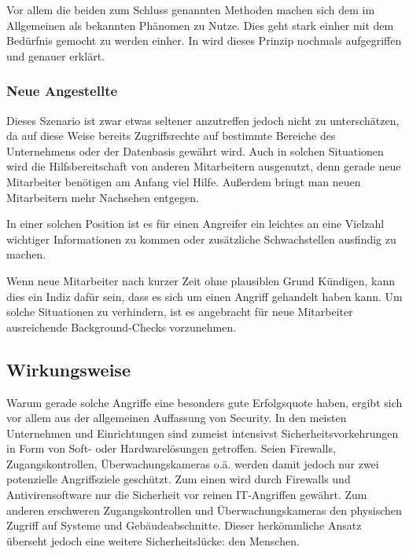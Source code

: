 Vor allem die beiden zum Schluss genannten Methoden machen sich dem im Allgemeinen als  bekannten Phänomen zu Nutze. Dies geht stark einher mit dem Bedürfnis gemocht zu werden einher. In  wird dieses Prinzip nochmals aufgegriffen und genauer erklärt.


\subsubsection*{Neue Angestellte}\label{sec:neue-angestellte}
Dieses Szenario ist zwar etwas seltener anzutreffen jedoch nicht zu unterschätzen, da auf diese
Weise bereits Zugriffsrechte auf bestimmte Bereiche des Unternehmens oder der Datenbasis gewährt wird.
Auch in solchen Situationen wird die Hilfsbereitschaft von anderen Mitarbeitern ausgenutzt, denn
gerade neue Mitarbeiter benötigen am Anfang viel Hilfe.
Außerdem bringt man neuen Mitarbeitern mehr Nachsehen entgegen.

In einer solchen Position ist es für einen Angreifer ein leichtes an eine Vielzahl wichtiger
Informationen zu kommen oder zusätzliche Schwachstellen ausfindig zu machen.

Wenn neue Mitarbeiter nach kurzer Zeit ohne plausiblen Grund Kündigen, kann dies ein Indiz dafür sein,
dass es sich um einen Angriff gehandelt haben kann.
Um solche Situationen zu verhindern, ist es angebracht für neue Mitarbeiter ausreichende Background-Checks vorzunehmen. \citep{hacking-the-human}

\subsection{Wirkungsweise}\label{sec:wirkungsweise}

Warum gerade solche Angriffe eine besonders gute Erfolgsquote haben, ergibt sich vor allem aus der allgemeinen Auffassung von Security.
In den meisten Unternehmen und Einrichtungen sind zumeist intensivst Sicherheitsvorkehrungen in Form von Soft- oder Hardwarelösungen getroffen.
Seien Firewalls, Zugangskontrollen, Überwachungskameras o.ä. werden damit jedoch nur zwei potenzielle Angriffsziele geschützt.
Zum einen wird durch Firewalls und Antivirensoftware nur die Sicherheit vor reinen IT-Angriffen gewährt.
Zum anderen erschweren Zugangskontrollen und Überwachungskameras den physischen Zugriff auf Systeme und Gebäudeabschnitte.
Dieser herkömmliche Ansatz überseht jedoch eine weitere Sicherheitslücke: den Menschen.
\citep{hacking-the-human}


